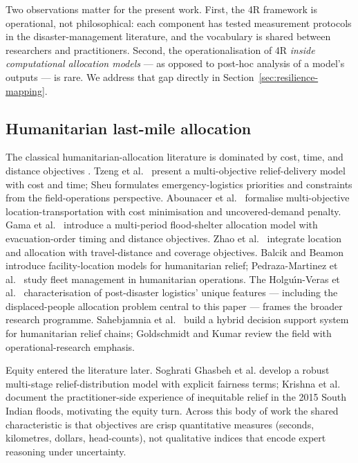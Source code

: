 \documentclass[applsci,article,submit,moreauthors,pdftex]{Definitions/mdpi}
\begin{document}
Two observations matter for the present work. First, the 4R framework is
operational, not philosophical: each component has tested measurement
protocols in the disaster-management literature, and the vocabulary is
shared between researchers and practitioners. Second, the operationalisation
of 4R \emph{inside computational allocation models} --- as opposed to
post-hoc analysis of a model's outputs --- is rare. We address that gap
directly in Section~\ref{sec:resilience-mapping}.

\subsection{Humanitarian last-mile allocation}\label{sec:related-allocation}

The classical humanitarian-allocation literature is dominated by cost,
time, and distance objectives \cite{altay2006, galindo2013, caunhye2012,
anayaarenas2014}. Tzeng et al.\ \cite{tzeng2007} present a multi-objective
relief-delivery model with cost and time; Sheu \cite{sheu2007} formulates
emergency-logistics priorities and constraints from the field-operations
perspective. Abounacer et al.\ \cite{abounacer2014} formalise
multi-objective location-transportation with cost minimisation and
uncovered-demand penalty. Gama et al.\ \cite{gama2016} introduce a
multi-period flood-shelter allocation model with evacuation-order timing
and distance objectives. Zhao et al.\ \cite{zhao2017} integrate location
and allocation with travel-distance and coverage objectives. Balcik and
Beamon \cite{balcik2008} introduce facility-location models for
humanitarian relief; Pedraza-Martinez et al.\ \cite{pedrazamartinez2011}
study fleet management in humanitarian operations. The Holgu{\'\i}n-Veras
et al.\ \cite{holguinveras2012} characterisation of post-disaster
logistics' unique features --- including the displaced-people allocation
problem central to this paper --- frames the broader research programme.
Sahebjamnia et al.\ \cite{sahebjamnia2017} build a hybrid decision
support system for humanitarian relief chains; Goldschmidt and Kumar
\cite{goldschmidt2016} review the field with operational-research
emphasis.

Equity entered the literature later. Soghrati Ghasbeh et al.
\cite{soghrati2022} develop a robust multi-stage relief-distribution model
with explicit fairness terms; Krishna et al. \cite{krishna2021} document
the practitioner-side experience of inequitable relief in the 2015 South
Indian floods, motivating the equity turn. Across this body of work the
shared characteristic is that objectives are crisp quantitative measures
(seconds, kilometres, dollars, head-counts), not qualitative indices that
encode expert reasoning under uncertainty.
\end{document}
